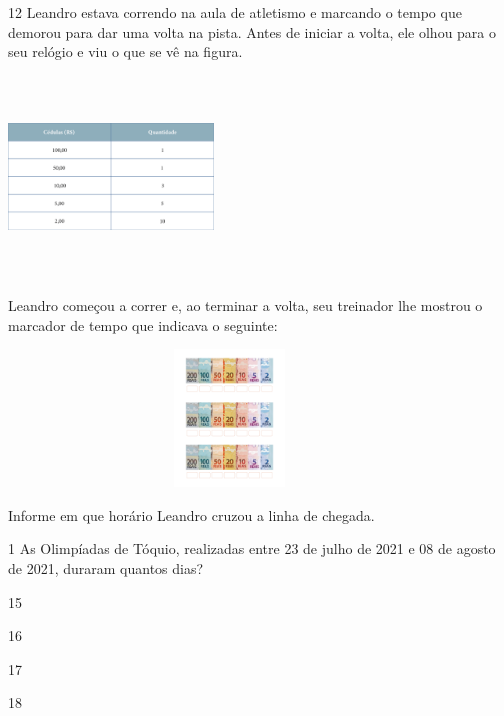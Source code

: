 \num{12} Leandro estava correndo na aula de atletismo e marcando o tempo que
demorou para dar uma volta na pista. Antes de iniciar a volta, ele olhou
para o seu relógio e viu o que se vê na figura.


\includegraphics[width=2.14583in,height=2.10113in]{media/image66.png}

Leandro começou a correr e, ao terminar a volta, seu treinador lhe
mostrou o marcador de tempo que indicava o seguinte:


\includegraphics[width=4.61458in,height=1.43750in]{media/image67.png}

Informe em que horário Leandro cruzou a linha de chegada.



\num{1} As Olimpíadas de Tóquio, realizadas entre 23 de julho de 2021 e 08 de
agosto de 2021, duraram quantos dias?

\begin{minipage}{.5\textwidth}
\begin{escolha}
\item 15

\item 16

\item 17

\item 18
\end{escolha}
\end{minipage}

